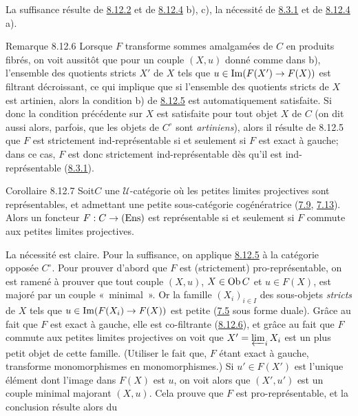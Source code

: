 \documentclass[10pt]{../fichiers-configuration-latex/smfart}
\begin{document}
La suffisance résulte de \hyperref[I.prop8.12.2]{8.12.2} et de \hyperref[I.lem8.12.4]{8.12.4}
b), c), la nécessité de \hyperref[I.prop8.3.1]{8.3.1} et de \hyperref[I.lem8.12.4]{8.12.4}
a).

\begin{enonce*}[remark]{Remarque 8.12.6}
Lorsque $F$ transforme sommes amalgamées de $C$ en produits fibrés,
on voit aussitôt que pour un couple $(X,u)$ donné comme dans b),
l'ensemble des quotients stricts $X'$ de $X$ tels que $u\in
\operatorname{Im}(F(X')\rightarrow F(X))$ est filtrant décroissant, ce qui
implique que si l'ensemble des quotients stricts de $X$ est
artinien, alors la condition b) de \hyperref[I.prop8.12.5]{8.12.5} est
automatiquement satisfaite. Si donc la condition précédente sur $X$
est satisfaite pour tout objet $X$ de $C$ (on dit aussi alors,
parfois, que les objets de $C^\circ$ sont \emph{artiniens}), alors
il résulte de 8.12.5 que $F$ est strictement ind-représentable si et
seulement si $F$ est exact à gauche; dans ce cas, $F$ est donc
strictement ind-représentable dès qu'il est ind-représentable
(\hyperref[I.prop8.3.1]{8.3.1}).
\end{enonce*}

\begin{enonce*}{Corollaire 8.12.7}
Soit\pageoriginale $C$ une $𝒰$-catégorie où les petites
limites projectives sont représentables, et admettant une petite
sous-catégorie cogénératrice (\hyperref[I.sec7.9]{7.9},
\hyperref[I.exem7.13]{7.13}). Alors un foncteur
$F:C\rightarrow (\operatorname{Ens})$ est représentable si et seulement si $F$
commute aux petites limites projectives.
\end{enonce*}
La nécessité est claire. Pour la suffisance, on applique
\hyperref[I.prop8.12.5]{8.12.5}  à la catégorie opposée $C^\circ$. Pour prouver
d'abord que $F$ est (strictement) pro-représentable, on est ramené à
prouver que tout couple $(X,u)$, $X\in \operatorname{Ob} C$ et $u\in F(X)$, est
majoré par un couple « minimal ». Or la famille $(X_i)_{i\in I}$
des sous-objets \emph{stricts} de $X$ tels que $u\in
\operatorname{Im}(F(X_i)\rightarrow F(X))$ est petite (\hyperref[I.cor7.5]{7.5} sous forme
duale). Grâce au fait que $F$ est exact à gauche, elle est
co-filtrante (\hyperref[I.rem8.12.6]{8.12.6}), et grâce au fait que $F$ commute
aux petites limites projectives on voit que $X'=\varprojlim_i X_i$
est un plus petit objet de cette famille. (Utiliser le fait que, $F$
étant exact à gauche, transforme monomorphismes en monomorphismes.)
Si $u'\in F(X')$ est l'unique élément dont l'image dans $F(X)$ est
$u$, on voit alors que $(X',u')$ est un couple minimal majorant
$(X,u)$. Cela prouve que $F$ est pro-représentable, et la conclusion
résulte alors du
\end{document}
